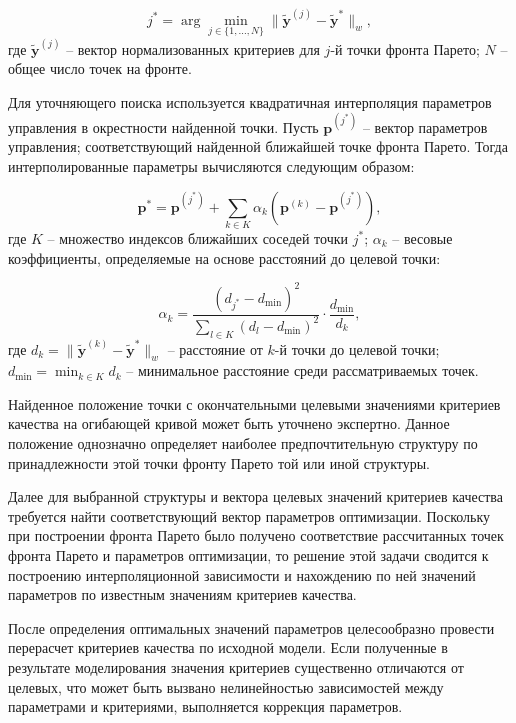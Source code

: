 \begin{equation}\label{eq:brute_force_search}
	j^* = \arg\min_{j \in \{1,\ldots,N\}} \|\mathbf{\tilde{y}}^{(j)} - \mathbf{\tilde{y}}^*\|_w,
\end{equation}
где $\mathbf{\tilde{y}}^{(j)}$ -- вектор нормализованных критериев для $j$-й точки фронта Парето;
$N$ -- общее число точек на фронте.

Для уточняющего поиска используется квадратичная интерполяция параметров управления в
окрестности найденной точки. Пусть $\mathbf{p}^{(j^*)}$ -- вектор параметров управления;
соответствующий найденной ближайшей точке фронта Парето.
Тогда интерполированные параметры вычисляются следующим образом:

\begin{equation}\label{eq:interpolation}
	\mathbf{p}^* = \mathbf{p}^{(j^*)} + \sum_{k \in K} \alpha_k (\mathbf{p}^{(k)} - \mathbf{p}^{(j^*)}),
\end{equation}
где $K$ -- множество индексов ближайших соседей точки $j^*$;
$\alpha_k$ -- весовые коэффициенты, определяемые на основе расстояний до целевой точки:

\begin{equation}\label{eq:interpolation_weights}
	\alpha_k = \frac{(d_{j^*} - d_{\min})^2}{\sum_{l \in K} (d_l - d_{\min})^2} \cdot \frac{d_{\min}}{d_k},
\end{equation}
где $d_k = \|\mathbf{\tilde{y}}^{(k)} - \mathbf{\tilde{y}}^*\|_w$ -- расстояние от $k$-й точки до целевой точки;
$d_{\min} = \min_{k \in K} d_k$ -- минимальное расстояние среди рассматриваемых точек.

Найденное положение точки с окончательными целевыми значениями
критериев качества на огибающей кривой может быть уточнено экспертно.
Данное положение однозначно определяет наиболее предпочтительную структуру
по принадлежности этой точки фронту Парето той или иной структуры.

Далее для выбранной структуры и вектора целевых значений критериев качества
требуется найти соответствующий вектор параметров оптимизации.
Поскольку при построении фронта Парето было получено соответствие
рассчитанных точек фронта Парето и параметров оптимизации, то решение
этой задачи сводится к построению интерполяционной зависимости и
нахождению по ней значений параметров по известным значениям критериев качества.

После определения оптимальных значений параметров целесообразно провести перерасчет
критериев качества по исходной модели. Если полученные в результате моделирования значения
критериев существенно отличаются от целевых, что может быть вызвано нелинейностью зависимостей
между параметрами и критериями, выполняется коррекция параметров.


